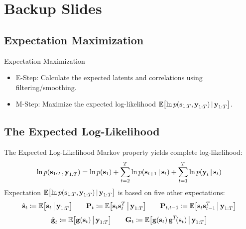 \documentclass[
	aspectratio=43,
	color={accentcolor=1c},
	logo=false,
	colorframetitle=true
]{tudabeamer}
\begin{document}
	\section{Backup Slides} \sectionslide
		\subsection{Expectation Maximization}
			\begin{frame}{Expectation Maximization}
				\begin{itemize}
					\item E-Step: Calculate the expected latents and correlations using filtering/smoothing.
					\item M-Step: Maximize the expected log-likelihood \( \mathbb{E}\big[\! \ln p(\boldsymbol{\mathrm{s}}_{1:T}, \boldsymbol{\mathrm{y}}_{1:T}) \,\vert\, \boldsymbol{\mathrm{y}}_{1:T} \big] \).
				\end{itemize}
			\end{frame}

		\subsection{The Expected Log-Likelihood}
			\begin{frame}{The Expected Log-Likelihood}
				Markov property yields complete log-likelihood:
				\begin{align*}
					\ln p(\boldsymbol{\mathrm{s}}_{1:T}, \boldsymbol{\mathrm{y}}_{1:T}) = \ln p(\boldsymbol{\mathrm{s}}_1) + \sum_{t = 2}^{T} \ln p(\boldsymbol{\mathrm{s}}_{t + 1} \,\vert\, \boldsymbol{\mathrm{s}}_t) + \sum_{t = 1}^{T} \ln p(\boldsymbol{\mathrm{y}}_t \,\vert\, \boldsymbol{\mathrm{s}}_t)
				\end{align*}
				Expectation \( \mathbb{E}\big[\! \ln p(\boldsymbol{\mathrm{s}}_{1:T}, \boldsymbol{\mathrm{y}}_{1:T}) \,\vert\, \boldsymbol{\mathrm{y}}_{1:T} \big] \) is based on five other expectations:
				\begin{align*}
					\hat{\boldsymbol{\mathrm{s}}}_t \coloneqq \mathbb{E}\big[ \boldsymbol{\mathrm{s}}_t \,\big\vert\, \boldsymbol{\mathrm{y}}_{1:T} \big]
					\qquad
					\boldsymbol{\mathrm{P}}_t \coloneqq \mathbb{E}\big[ \boldsymbol{\mathrm{s}}_t \boldsymbol{\mathrm{s}}_t^T \,\big\vert\, \boldsymbol{\mathrm{y}}_{1:T} \big]
					\qquad
					\boldsymbol{\mathrm{P}}_{t, t - 1} \coloneqq \mathbb{E}\big[ \boldsymbol{\mathrm{s}}_t \boldsymbol{\mathrm{s}}_{t - 1}^T \,\big\vert\, \boldsymbol{\mathrm{y}}_{1:T} \big]
				\end{align*}
				\begin{align*}
					\hat{\boldsymbol{\mathrm{g}}}_t \coloneqq \mathbb{E}\big[ \boldsymbol{\mathrm{g}}(\boldsymbol{\mathrm{s}}_t) \,\big\vert\, \boldsymbol{\mathrm{y}}_{1:T} \big]
					\qquad
					\boldsymbol{\mathrm{G}}_t \coloneqq \mathbb{E}\big[ \boldsymbol{\mathrm{g}}(\boldsymbol{\mathrm{s}}_t) \, \boldsymbol{\mathrm{g}}^T\!(\boldsymbol{\mathrm{s}}_t) \,\big\vert\, \boldsymbol{\mathrm{y}}_{1:T} \big]
				\end{align*}
			\end{frame}
\end{document}
